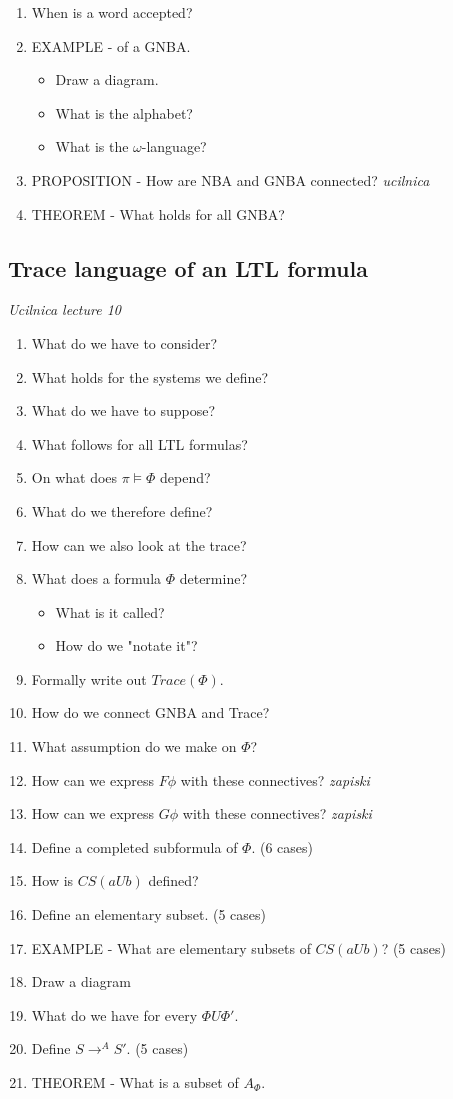 \documentclass[fleqn]{article}
\begin{document}
\begin{enumerate}
    \item When is a word accepted?
    \item EXAMPLE - of a GNBA.
    \begin{itemize}
        \item Draw a diagram.
        \item What is the alphabet?
        \item What is the $\omega$-language?
    \end{itemize}
    \item PROPOSITION - How are NBA and GNBA connected? \textit{ucilnica}
    \item THEOREM - What holds for all GNBA?
\end{enumerate}

\subsection{Trace language of an LTL formula}
\textit{Ucilnica lecture 10}
\begin{enumerate}
    \item What do we have to consider?
    \item What holds for the systems we define?
    \item What do we have to suppose?
    \item What follows for all LTL formulas?
    \item On what does $\pi \models \Phi$ depend?
    \item What do we therefore define?
    \item How can we also look at the trace?
    \item What does a formula $\Phi$ determine?
    \begin{itemize}
        \item What is it called?
        \item How do we "notate it"?
    \end{itemize}
    \item Formally write out $Trace(\Phi)$.
    \item How do we connect GNBA and Trace?
    \item What assumption do we make on $\Phi$?
    \item How can we express $F \phi$ with these connectives? \textit{zapiski}
    \item How can we express $G \phi$ with these connectives? \textit{zapiski}
    \item Define a completed subformula of $\Phi$. (6 cases)
    \item How is $CS(a U b) $ defined?
    \item Define an elementary subset. (5 cases)
    \item EXAMPLE - What are elementary subsets of $CS(a U b)$? (5 cases)
    \item Draw a diagram
    \item What do we have for every $\Phi U \Phi'$.
    \item Define $S \rightarrow^{A} S'$. (5 cases)
    \item THEOREM - What is a subset of $A_{\Phi}$.
\end{enumerate}
\end{document}
